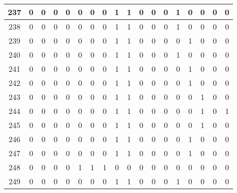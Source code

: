 \begin{tabular}{|c|c|c|c|c|c|c|c|c|c|c|c|c|c|c|c|c|c|}
\midrule
237    &    0 &    0 &    0 &   0 &        0 &        0 &    0 &    1 &    1 &    0 &    0 &    0 &    1 &    0 &     0 &    0 &     0 \\
\midrule
238    &    0 &    0 &    0 &   0 &        0 &        0 &    0 &    1 &    1 &    0 &    0 &    0 &    1 &    0 &     0 &    0 &     0 \\
\midrule
239    &    0 &    0 &    0 &   0 &        0 &        0 &    0 &    1 &    1 &    0 &    0 &    0 &    0 &    1 &     0 &    0 &     0 \\
\midrule
240    &    0 &    0 &    0 &   0 &        0 &        0 &    0 &    1 &    1 &    0 &    0 &    0 &    1 &    0 &     0 &    0 &     0 \\
\midrule
241    &    0 &    0 &    0 &   0 &        0 &        0 &    0 &    1 &    1 &    0 &    0 &    0 &    0 &    1 &     0 &    0 &     0 \\
\midrule
242    &    0 &    0 &    0 &   0 &        0 &        0 &    0 &    1 &    1 &    0 &    0 &    0 &    0 &    1 &     0 &    0 &     0 \\
\midrule
243    &    0 &    0 &    0 &   0 &        0 &        0 &    0 &    1 &    1 &    0 &    0 &    0 &    0 &    0 &     1 &    0 &     0 \\
\midrule
244    &    0 &    0 &    0 &   0 &        0 &        0 &    0 &    1 &    1 &    0 &    0 &    0 &    0 &    0 &     1 &    0 &     1 \\
\midrule
245    &    0 &    0 &    0 &   0 &        0 &        0 &    0 &    1 &    1 &    0 &    0 &    0 &    0 &    0 &     1 &    0 &     0 \\
\midrule
246    &    0 &    0 &    0 &   0 &        0 &        0 &    0 &    1 &    1 &    0 &    0 &    0 &    0 &    1 &     0 &    0 &     0 \\
\midrule
247    &    0 &    0 &    0 &   0 &        0 &        0 &    0 &    1 &    1 &    0 &    0 &    0 &    0 &    1 &     0 &    0 &     0 \\
\midrule
248    &    0 &    0 &    0 &   0 &        1 &        1 &    1 &    0 &    0 &    0 &    0 &    0 &    0 &    0 &     0 &    0 &     0 \\
\midrule
249    &    0 &    0 &    0 &   0 &        0 &        0 &    0 &    1 &    1 &    0 &    0 &    0 &    1 &    0 &     0 &    0 &     0 \\\bottomrule\end{tabular}
